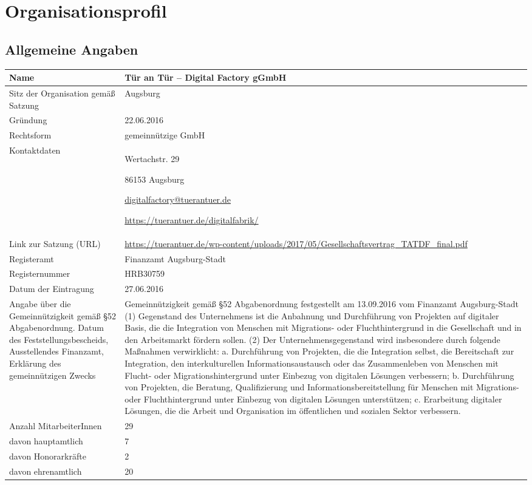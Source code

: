 \documentclass[12pt, a4paper]{article} %
\begin{document}
\hypertarget{organisationsprofil}{%
\section{Organisationsprofil}\label{organisationsprofil}}
\hypertarget{allgemeine-angaben}{%
\subsection{Allgemeine Angaben}\label{allgemeine-angaben}}

\begin{adjustwidth}{-1cm}{-1cm}
\begin{tabularx}{\textwidth+2cm}{p{5cm}X}
\toprule
Name & Tür an Tür – Digital Factory gGmbH\tabularnewline
\midrule
Sitz der Organisation gemäß Satzung & Augsburg\tabularnewline
\midrule
Gründung & 22.06.2016\tabularnewline
\midrule
Rechtsform & gemeinnützige GmbH\tabularnewline
\midrule
\begin{minipage}[t]{0.47\columnwidth}\raggedright
Kontaktdaten\strut
\end{minipage} & \begin{minipage}[t]{\columnwidth}
Wertachstr. 29

86153 Augsburg

\href{mailto:digitalfactory@tuerantuer.de}{\url{digitalfactory@tuerantuer.de}}

\url{https://tuerantuer.de/digitalfabrik/}
\end{minipage}\tabularnewline
\midrule
Link zur Satzung (URL) & \url{https://tuerantuer.de/wp-content/uploads/2017/05/Gesellschaftsvertrag\_TATDF\_final.pdf}\tabularnewline
\midrule
Registeramt & Finanzamt Augsburg-Stadt\tabularnewline
Registernummer & HRB30759\tabularnewline
Datum der Eintragung & 27.06.2016\tabularnewline
\midrule
Angabe über die Gemeinnützigkeit gemäß §52 Abgabenordnung. Datum des
Feststellungsbescheids, Ausstellendes Finanzamt, Erklärung des
gemeinnützigen Zwecks & Gemeinnützigkeit gemäß §52 Abgabenordnung
festgestellt am 13.09.2016 vom Finanzamt Augsburg-Stadt (1) Gegenstand
des Unternehmens ist die Anbahnung und Durchführung von Projekten auf
digitaler Basis, die die Integration von Menschen mit Migrations- oder
Fluchthintergrund in die Gesellschaft und in den Arbeitsmarkt fördern
sollen. (2) Der Unternehmensgegenstand wird insbesondere durch folgende
Maßnahmen verwirklicht: a. Durchführung von Projekten, die die
Integration selbst, die Bereitschaft zur Integration, den
interkulturellen Informationsaustausch oder das Zusammenleben von
Menschen mit Flucht- oder Migrationshintergrund unter Einbezug von
digitalen Lösungen verbessern; b. Durchführung von Projekten, die
Beratung, Qualifizierung und Informationsbereitstellung für Menschen mit
Migrations- oder Fluchthintergrund unter Einbezug von digitalen Lösungen
unterstützen; c. Erarbeitung digitaler Lösungen, die die Arbeit und
Organisation im öffentlichen und sozialen Sektor
verbessern.\tabularnewline
\midrule
Anzahl MitarbeiterInnen & 29 \tabularnewline
davon hauptamtlich & 7 \tabularnewline
davon Honorarkräfte & 2 \tabularnewline
davon ehrenamtlich & 20 \tabularnewline
\bottomrule
\end{tabularx}
\end{adjustwidth}
\end{document}
